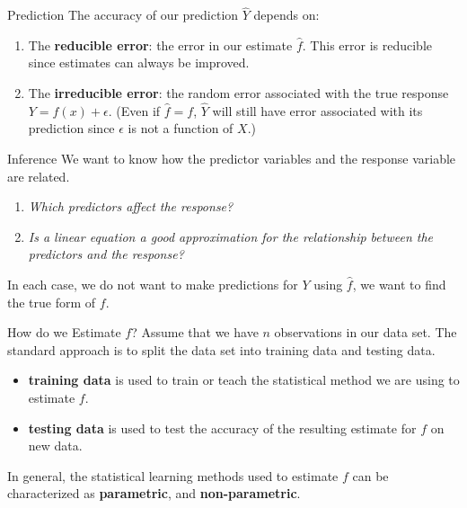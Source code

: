 \documentclass[
  ignorenonframetext,
  aspectratio=169,
]{beamer}
\providecommand{\tightlist}{%
  \setlength{\itemsep}{0pt}\setlength{\parskip}{0pt}}\usepackage{longtable,booktabs,array}
\begin{document}
\begin{frame}{Prediction}
\protect\hypertarget{prediction-1}{}
The accuracy of our prediction \(\hat Y\) depends on:

\begin{enumerate}
\tightlist
\item
  The \textbf{reducible error}: the error in our estimate \(\hat f\).
  This error is reducible since estimates can always be improved.
\item
  The \textbf{irreducible error}: the random error associated with the
  true response \(Y = f(x) + \epsilon\). (Even if \(\hat f = f\),
  \(\hat Y\) will still have error associated with its prediction since
  \(\epsilon\) is not a function of \(X\).)
\end{enumerate}
\end{frame}

\begin{frame}{Inference}
\protect\hypertarget{inference}{}
We want to know how the predictor variables and the response variable
are related.

\begin{enumerate}
\tightlist
\item
  \emph{Which predictors affect the response?}
\item
  \emph{Is a linear equation a good approximation for the relationship
  between the predictors and the response?}
\end{enumerate}

In each case, we do not want to make predictions for \(Y\) using
\(\hat f\), we want to find the true form of \(f\).
\end{frame}

\begin{frame}{How do we Estimate \(f\)?}
\protect\hypertarget{how-do-we-estimate-f}{}
Assume that we have \(n\) observations in our data set. The standard
approach is to split the data set into training data and testing data.

\begin{itemize}
\tightlist
\item
  \textbf{training data} is used to train or teach the statistical
  method we are using to estimate \(f\).
\item
  \textbf{testing data} is used to test the accuracy of the resulting
  estimate for \(f\) on new data.
\end{itemize}

In general, the statistical learning methods used to estimate \(f\) can
be characterized as \textbf{parametric}, and \textbf{non-parametric}.
\end{frame}
\end{document}
